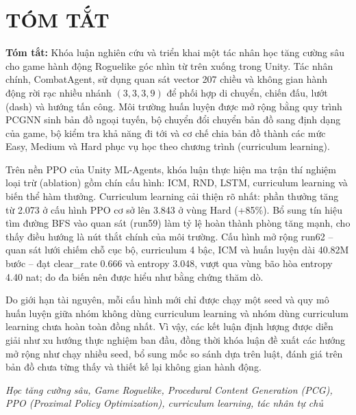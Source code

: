 \clearpage
{}

\chapter*{\fontsize{13}{13}\selectfont\textbf{TÓM TẮT}}

\noindent\textbf{Tóm tắt:} Khóa luận nghiên cứu và triển khai một tác nhân học tăng cường sâu cho game hành động Roguelike góc nhìn từ trên xuống trong Unity. Tác nhân chính, CombatAgent, sử dụng quan sát vector 207 chiều và không gian hành động rời rạc nhiều nhánh $(3,3,3,9)$ để phối hợp di chuyển, chiến đấu, lướt (dash) và hướng tấn công. Môi trường huấn luyện được mở rộng bằng quy trình PCGNN sinh bản đồ ngoại tuyến, bộ chuyển đổi chuyển bản đồ sang định dạng của game, bộ kiểm tra khả năng đi tới và cơ chế chia bản đồ thành các mức Easy, Medium và Hard phục vụ học theo chương trình (curriculum learning).

Trên nền PPO của Unity ML-Agents, khóa luận thực hiện ma trận thí nghiệm loại trừ (ablation) gồm chín cấu hình: ICM, RND, LSTM, curriculum learning và biến thể hàm thưởng. Curriculum learning cải thiện rõ nhất: phần thưởng tăng từ 2.073 ở cấu hình PPO cơ sở lên 3.843 ở vùng Hard (+85\%). Bổ sung tín hiệu tìm đường BFS vào quan sát (run59) làm tỷ lệ hoàn thành phòng tăng mạnh, cho thấy điều hướng là nút thắt chính của môi trường. Cấu hình mở rộng run62 -- quan sát lưới chiếm chỗ cục bộ, curriculum 4 bậc, ICM và huấn luyện dài 40.82M bước -- đạt clear\_rate 0.666 và entropy 3.048, vượt qua vùng bão hòa entropy 4.40 nat; do đa biến nên được hiểu như bằng chứng thăm dò.

Do giới hạn tài nguyên, mỗi cấu hình mới chỉ được chạy một seed và quy mô huấn luyện giữa nhóm không dùng curriculum learning và nhóm dùng curriculum learning chưa hoàn toàn đồng nhất. Vì vậy, các kết luận định lượng được diễn giải như xu hướng thực nghiệm ban đầu, đồng thời khóa luận đề xuất các hướng mở rộng như chạy nhiều seed, bổ sung mốc so sánh dựa trên luật, đánh giá trên bản đồ chưa từng thấy và thiết kế lại không gian hành động.

\vspace{0.5cm}
 \textit{Học tăng cường sâu, Game Roguelike, Procedural Content Generation (PCG), PPO (Proximal Policy Optimization), curriculum learning, tác nhân tự chủ}
